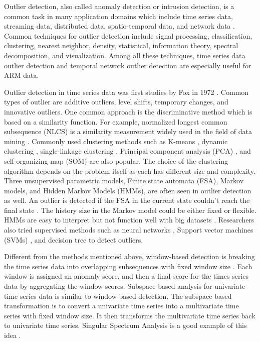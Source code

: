 \documentclass[letterpaper, 10 pt, conference]{ieeeconf}  %
\begin{document}
Outlier detection, also called anomaly detection or intrusion detection, is a common task in many application domains which include time series data, streaming data, distributed data, spatio-temporal data, and network data \cite{gupta2014outlier}. Common techniques for outlier detection include signal processing, classification, clustering, nearest neighbor, density, statistical, information theory, spectral decomposition, and visualization. Among all these techniques, time series data outlier detection and temporal network outlier detection are especially useful for ARM data.

Outlier detection in time series data was first studies by Fox in 1972 \cite{fox1972outliers}. Common types of outlier are additive outliers, level shifts, temporary changes, and innovative outliers. One common approach is the discriminative method which is based on a similarity function. For example, normalized longest common subsequence (NLCS) is a similarity measurement widely used in the field of data mining \cite{budalakoti2009anomaly, chandola2008comparative, sequeira2002admit}. Commonly used clustering methods such as K-means \cite{macqueen1967some}, dynamic clustering \cite{sequeira2002admit}, single-linkage clustering \cite{portnoy2001intrusion}, Principal component analysis (PCA) \cite{gupta2013context}, and self-organizing map (SOM) \cite{gonzalez2003anomaly} are also popular. The choice of the clustering algorithm depends on the problem itself as each has different size and complexity. Three unsupervised parametric models, Finite state automata (FSA), Markov models, and Hidden Markov Models (HMMs), are often seen in outlier detection as well. An outlier is detected if the FSA in the current state couldn't reach the final state \cite{chandola2008comparative}. The history size in the Markov model could be either fixed or flexible. HMMs are easy to interpret but not function well with big datasets \cite{chandola2008comparative}. Researchers also tried supervised methods such as neural networks \cite{dasgupta2000comparison}, Support vector machines (SVMs) \cite{li2006motion}, and decision tree \cite{kang2005learning} to detect outliers.

Different from the methods mentioned above, window-based detection is breaking the time series data into overlapping subsequences with fixed window size \cite{cheboli2010anomaly}. Each window is assigned an anomaly score, and then a final score for the times series data by aggregating the window scores. Subspace based analysis for univariate time series data is similar to window-based detection. The subspace based transformation is to convert a univariate time series into a multivariate time series with fixed window size. It then transforms the multivariate time series back to univariate time series. Singular Spectrum Analysis is a good example of this idea \cite{golyandina2013singular}.
\end{document}
